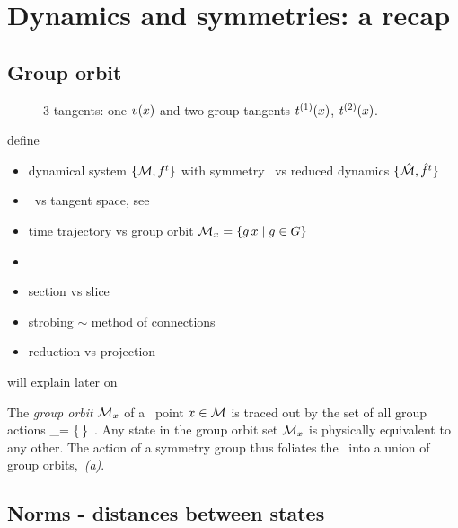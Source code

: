 
\section{Dynamics and symmetries: a recap}
\label{s:cut}

\subsection{Group orbit}

    \ifdraft\color{blue}
\begin{figure}
   \centering
   \caption{\label{fig:tangents}
3 tangents: one $v(x)$  and two group tangents
$t^{(1)}(x)$, $t^{(2)}(x)$.
}
\end{figure}

define
\begin{itemize}
  \item dynamical system $\{{\cal M},f^t\}$ with symmetry \Group\
        vs reduced dynamics $\{\hat{\cal M},\hat{f}^t\}$
  \item \statesp\ vs tangent space, see 
  \item time trajectory \flowRed{\zeit}{\ssp} vs group orbit
        ${\cal M}_{x} = \{g\,x \mid g \in {\ensuremath{G}}\}$
  \item \template
  \item section {\PoincS} vs slice \pSRed
  \item strobing $\sim$ method of connections
  \item reduction vs projection
\end{itemize}
will explain later on
    \color{black}\fi

The \emph{group orbit} ${\cal M}_{x} $ of a \statesp\ point $x \in {\cal M}$ is
traced out by the set of all group actions
\beq
\pS_\ssp = \{\LieEl\,\ssp \mid \LieEl \in {\Group}\}
\,.
Any state in the  group orbit set ${\cal M}_{x}$
is physically equivalent to any other. The action of a symmetry group
thus foliates the \statesp\ into a union of group orbits,
\,{\it (a)}.

\subsection{Norms - distances between states}

